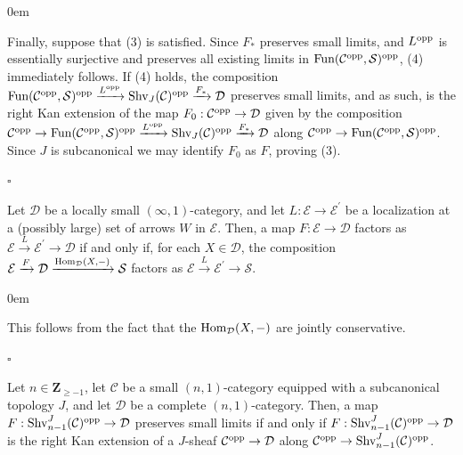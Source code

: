 \documentclass[10pt]{article}
\newcommand{\mS}{\mathcal S}
\newcommand{\C}{\mathcal C}
\newcommand{\cD}{\mathcal{D}}
\newcommand{\cE}{\mathcal{E}}
\newcommand{\ZZ}{\mathbb{Z}}
\def\ZZ{{\mathbf Z}}
\renewcommand{\qed}{\hfill$\square$}
\renewenvironment{proof}{\begin{addmargin}[1em]{0em}\begin{newproof}}{\end{newproof}\end{addmargin}\qed}
\theoremstyle{witharg}
\theoremstyle{witharg}
\theoremstyle{witharg2}
\begin{document}
\begin{proof}
Finally, suppose that (3) is satisfied. Since $F_*$ preserves small limits, and $L^{\textnormal{opp}}$ is essentially surjective and preserves all existing limits in $\textnormal{Fun}(\C^{\textnormal{opp}},\mS)^{\textnormal{opp}}$, (4) immediately follows. If (4) holds, the composition $\textnormal{Fun}(\C^{\textnormal{opp}},\mS)^{\textnormal{opp}}\xrightarrow{L^{\textnormal{opp}}}\textnormal{Shv}_J(\C)^{\textnormal{opp}}\xrightarrow{F_*}\cD$ preserves small limits, and as such, is the right Kan extension of the map $F_0:\C^{\textnormal{opp}}\rightarrow \cD$ given by the composition $\C^{\textnormal{opp}}\rightarrow \textnormal{Fun}(\C^{\textnormal{opp}},\mS)^{\textnormal{opp}}\xrightarrow{L^{\textnormal{opp}}}\textnormal{Shv}_J(\C)^{\textnormal{opp}}\xrightarrow{F_*}\cD$ along $\C^{\textnormal{opp}}\rightarrow \textnormal{Fun}(\C^{\textnormal{opp}},\mS)^{\textnormal{opp}}$. Since $J$ is subcanonical we may identify $F_0$ as $F$, proving (3). 




    
\end{proof}








\begin{lemma}{}\label{localizations lemma}

    Let $\cD$ be a locally small $(\infty,1)$-category, and let $L:\cE\rightarrow \cE^\prime$ be a localization at a (possibly large) set of arrows $W$ in $\cE$. Then, a map $F:\cE\rightarrow \cD$ factors as $\cE\xrightarrow{L}\cE^\prime\rightarrow \cD$ if and only if, for each $X\in \cD$, the composition $\cE\xrightarrow{F}\cD\xrightarrow{\textnormal{Hom}_\cD(X,-)}\mS$ factors as $\cE\xrightarrow{L}\cE^\prime\rightarrow \mS$. 

\end{lemma}

\begin{proof}

    This follows from the fact that the $\textnormal{Hom}_\cD(X,-)$ are jointly conservative.  
    
\end{proof}






\begin{corollary}{}\label{univ prperty of n-1 sheaves}

    Let $n\in \ZZ_{\geq -1}$, let $\C$ be a small $(n,1)$-category equipped with a subcanonical topology $J$, and let $\cD$ be a complete $(n,1)$-category. Then, a map $F:\textnormal{Shv}^J_{n-1}(\C)^{\textnormal{opp}}\rightarrow \cD$ preserves small limits if and only if $F:\textnormal{Shv}^J_{n-1}(\C)^{\textnormal{opp}}\rightarrow \cD$ is the right Kan extension of a $J$-sheaf $\C^{\textnormal{opp}}\rightarrow \cD$ along $\C^{\textnormal{opp}}\rightarrow \textnormal{Shv}^J_{n-1}(\C)^{\textnormal{opp}}$.
    
\end{corollary}
\end{document}
